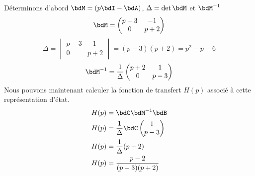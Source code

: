 Déterminons d'abord $\bdM=(p\bdI-\bdA)$, $\Delta=\det{\bdM}$ et $\bdM^{-1}$
\[
    \bdM=
    \begin{pmatrix} 
        p-3 & -1\\
        0 & p+2 
    \end{pmatrix}
\]
\[
    \Delta=
    \begin{vmatrix} 
        p-3 & -1\\
        0 & p+2 
    \end{vmatrix}=(p-3)(p+2)=p^2-p-6
\]
\[
    \bdM^{-1}=
    \dfrac{1}{\Delta}
    \begin{pmatrix} 
        p+2 &  1\\
        0 & p-3 
    \end{pmatrix}
\]
Nous pouvons maintenant calculer la fonction de transfert $H(p)$ associé à
cette représentation d'état.
\begin{align*}
    H(p)&=\bdC\bdM^{-1}\bdB\\
    H(p)&=\dfrac{1}{\Delta}\bdC\begin{pmatrix}1\\p-3\end{pmatrix}\\
    H(p)&=\dfrac{1}{\Delta}(p-2)\\
    H(p)&=\dfrac{p-2}{(p-3)(p+2)}
\end{align*}
